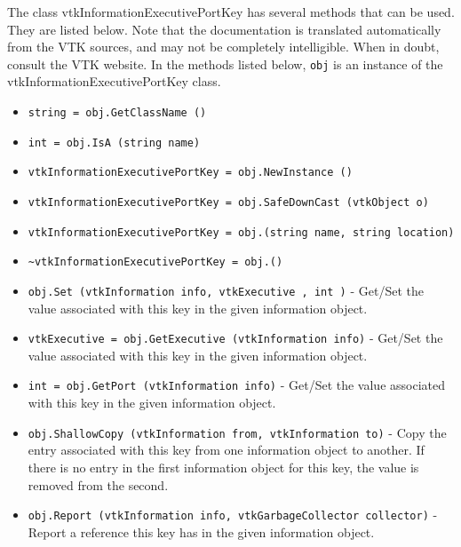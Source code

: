 The class vtkInformationExecutivePortKey has several methods that can be used.
  They are listed below.
Note that the documentation is translated automatically from the VTK sources,
and may not be completely intelligible.  When in doubt, consult the VTK website.
In the methods listed below, \verb|obj| is an instance of the vtkInformationExecutivePortKey class.
\begin{itemize}
\item  \verb|string = obj.GetClassName ()|

\item  \verb|int = obj.IsA (string name)|

\item  \verb|vtkInformationExecutivePortKey = obj.NewInstance ()|

\item  \verb|vtkInformationExecutivePortKey = obj.SafeDownCast (vtkObject o)|

\item  \verb|vtkInformationExecutivePortKey = obj.(string name, string location)|

\item  \verb|~vtkInformationExecutivePortKey = obj.()|

\item  \verb|obj.Set (vtkInformation info, vtkExecutive , int )| -  Get/Set the value associated with this key in the given
 information object.

\item  \verb|vtkExecutive = obj.GetExecutive (vtkInformation info)| -  Get/Set the value associated with this key in the given
 information object.

\item  \verb|int = obj.GetPort (vtkInformation info)| -  Get/Set the value associated with this key in the given
 information object.

\item  \verb|obj.ShallowCopy (vtkInformation from, vtkInformation to)| -  Copy the entry associated with this key from one information
 object to another.  If there is no entry in the first information
 object for this key, the value is removed from the second.

\item  \verb|obj.Report (vtkInformation info, vtkGarbageCollector collector)| -  Report a reference this key has in the given information object.

\end{itemize}
